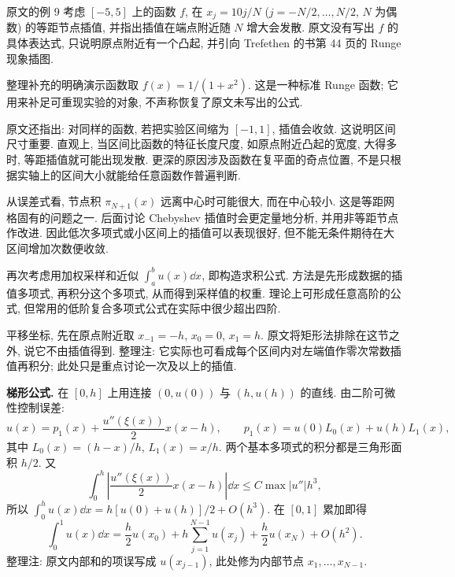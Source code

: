 \begin{example}\label{ex:runge}
原文的例 9 考虑 $[-5,5]$ 上的函数 $f$, 在 $x_j=10j/N$ ($j=-N/2,\ldots,N/2$, $N$ 为偶数) 的等距节点插值, 并指出插值在端点附近随 $N$ 增大会发散. 原文没有写出 $f$ 的具体表达式, 只说明原点附近有一个凸起, 并引向 Trefethen 的书第 44 页的 Runge 现象插图.

整理补充的明确演示函数取 $f(x)=1/(1+x^2)$. 这是一种标准 Runge 函数; 它用来补足可重现实验的对象, 不声称恢复了原文未写出的公式.
\end{example}



原文还指出: 对同样的函数, 若把实验区间缩为 $[-1,1]$, 插值会收敛. 这说明区间尺寸重要. 直观上, 当区间比函数的特征长度尺度, 如原点附近凸起的宽度, 大得多时, 等距插值就可能出现发散. 更深的原因涉及函数在复平面的奇点位置, 不是只根据实轴上的区间大小就能给任意函数作普遍判断.

从误差式看, 节点积 $\pi_{N+1}(x)$ 远离中心时可能很大, 而在中心较小. 这是等距网格固有的问题之一. 后面讨论 Chebyshev 插值时会更定量地分析, 并用非等距节点作改进. 因此低次多项式或小区间上的插值可以表现很好, 但不能无条件期待在大区间增加次数便收敛.


再次考虑用加权采样和近似 $\int_a^b u(x)\dd x$, 即构造求积公式. 方法是先形成数据的插值多项式, 再积分这个多项式, 从而得到采样值的权重. 理论上可形成任意高阶的公式, 但常用的低阶复合多项式公式在实际中很少超出四阶.

平移坐标, 先在原点附近取 $x_{-1}=-h$, $x_0=0$, $x_1=h$. 原文将矩形法排除在这节之外, 说它不由插值得到. 整理注: 它实际也可看成每个区间内对左端值作零次常数插值再积分; 此处只是重点讨论一次及以上的插值.

\textbf{梯形公式.} 在 $[0,h]$ 上用连接 $(0,u(0))$ 与 $(h,u(h))$ 的直线. 由二阶可微性控制误差:
\[
u(x)=p_1(x)+\frac{u''(\xi(x))}{2}x(x-h),\qquad
p_1(x)=u(0)L_0(x)+u(h)L_1(x),
\]
其中 $L_0(x)=(h-x)/h$, $L_1(x)=x/h$. 两个基本多项式的积分都是三角形面积 $h/2$. 又
\[
\int_0^h\left|\frac{u''(\xi(x))}{2}x(x-h)\right|\dd x
\leq C\max|u''|h^3,
\]
所以 $\int_0^h u(x)\dd x=h[u(0)+u(h)]/2+O(h^3)$. 在 $[0,1]$ 累加即得
\[
\int_0^1u(x)\dd x=\frac h2u(x_0)+h\sum_{j=1}^{N-1}u(x_j)+\frac h2u(x_N)+O(h^2).
\]
整理注: 原文内部和的项误写成 $u(x_{j-1})$, 此处修为内部节点 $x_1,\ldots,x_{N-1}$.

